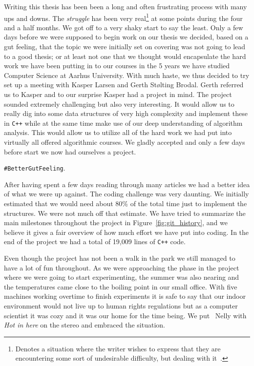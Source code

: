 \documentclass[twoside,11pt,openright]{report}
\begin{document}
Writing this thesis has been been a long and often frustrating process with many ups and downs. The \textit{struggle} has been very real\footnote{Denotes a situation where the writer wishes to express that they are encountering some sort of undesirable difficulty, but dealing with it~\cite{real_struggle}.} at some points during the four and a half months. We got off to a very shaky start to say the least. Only a few days before we were supposed to begin work on our thesis we decided, based on a gut feeling, that the topic we were initially set on covering was not going to lead to a good thesis; or at least not one that we thought would encapsulate the hard work we have been putting in to our courses in the 5 years we have studied Computer Science at Aarhus University. With much haste, we thus decided to try set up a meeting with Kasper Larsen and Gerth St\o lting Brodal. Gerth referred us to Kasper and to our surprise Kasper had a project in mind. The project sounded extremely challenging but also very interesting. It would allow us to really dig into some data structures of very high complexity and implement these in \texttt{C++} while at the same time make use of our deep understanding of algorithm analysis. This would allow us to utilize all of the hard work we had put into virtually all offered algorithmic courses. We gladly accepted and only a few days before start we now had ourselves a project.
\begin{center}
\texttt{\#BetterGutFeeling}.
\end{center}
After having spent a few days reading through many articles we had a better idea of what we were up against. The coding challenge was very daunting. We initially estimated that we would need about 80\% of the total time just to implement the structures. We were not much off that estimate. We have tried to summarize the main milestones throughout the project in Figure~\ref{fig:git_history}, and we believe it gives a fair overview of how much effort we have put into coding. In the end of the project we had a total of 19,009 lines of \texttt{C++} code.

Even though the project has not been a walk in the park we still managed to have a lot of fun throughout. As we were approaching the phase in the project where we were going to start experimenting, the summer was also nearing and the temperatures came close to the boiling point in our small office. With five machines working overtime to finish experiments it is safe to say that our indoor environment would not live up to human rights regulations but as a computer scientist it was cozy and it was our home for the time being. We put \twonotes~Nelly with \textit{Hot in here} on the stereo and embraced the situation.
\end{document}
